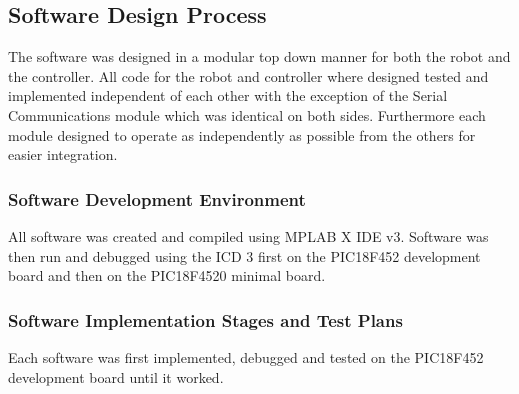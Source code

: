 \documentclass{article}
\begin{document}
\subsection{Software Design Process}
The software was designed in a modular top down manner for both the robot and the controller. All code for the robot and controller where designed tested and implemented independent of each other with the exception of the Serial Communications module which was identical on both sides. Furthermore each module designed to operate as independently as possible from the others for easier integration.
\subsubsection{Software Development Environment}
All software was created and compiled using MPLAB X IDE v3.
Software was then run and debugged using  the ICD 3 first on the PIC18F452 development board and then on the PIC18F4520 minimal board.
\subsubsection{Software Implementation Stages and Test Plans}
Each software was first implemented, debugged and tested on the PIC18F452 development board until it worked.
\end{document}
